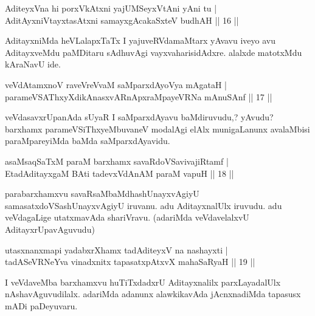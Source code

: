 
\begin{shl}
AditeyxVna hi porxVkAtxni yajUMSeyxVtAni yAni tu | \\
AditAyxniVtayxtasAtxni samayxgAcakaSxteV budhAH \hfill||  16 ||  
\end{shl}

\begin{artha}
AditayxniMda heVLalapxTaTx I yajuveRVdamaMtarx yAvavu iveyo avu 
AditayxveMdu paMDitaru sAdhuvAgi vayxvaharisidAdxre. alalxde matotxMdu 
kAraNavU ide.
\end{artha}

\begin{shl}
veVdAtamxnoV raveVreVvaM saMparxdAyoV\s ya mAgataH | \\
parameVSAThxyXdikAnasxvARnApxraMpayeVRNa mAnuSAnf \hfill||  17 || 
\end{shl}

\begin{artha}
veVdasavxrUpanAda sUyaR I saMparxdAyavu baMdiruvudu,? yAvudu? barxhamx 
parameVSiThxyeMbuvaneV modalAgi elAlx munigaLanunx avalaMbisi 
paraM\-pareyiMda baMda saMparxdAyavidu.
\end{artha}

\begin{shl}
asaMsaqSaTxM paraM barxhamx savaRdoVSavivajiRtamf | \\
EtadAditayxgaM BAti tadevxVdAnAM paraM vapuH \hfill||  18 ||  
\end{shl}

\begin{artha}
parabarxhamxvu savaRsaMbaMdhashUnayxvAgiyU samasatxdoVSashUnayxvAgiyU 
iruvanu. adu AditayxnalUlx iruvudu. adu veVdagaLige utatxmavAda 
shariVravu. (adariMda veVdavelalxvU AditayxrUpavAguvudu)
\end{artha}

\begin{shl}
utasxnanxmapi yadabxrXhamx tadAditeyxV na nashayxti | \\
tadASeVRNeYva vinadxnitx tapasatxpAtxvX mahaSaRyaH \hfill||  19 ||  
\end{shl}

\begin{artha}
I veVdaveMba barxhamxvu huTiTxdadxrU Aditayxnalilx parxLayadalUlx 
nAshavAguvudilalx. adariMda adanunx alawkikavAda jAcnxnadiMda tapasusx 
mADi paDeyuvaru.
\end{artha}

